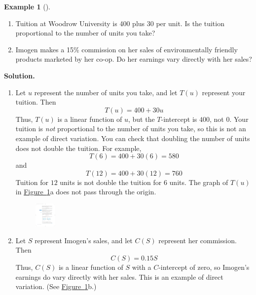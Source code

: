 \documentclass[10pt,]{book}
\theoremstyle{plain}
\theoremstyle{definition}
\theoremstyle{definition}
\theoremstyle{definition}
\newtheorem{example}[theorem]{Example}
\theoremstyle{definition}
\theoremstyle{definition}
\numberwithin{equation}{section}
\begin{document}
\begin{example}[]\label{example-two-linear-functions}
\leavevmode%
\begin{enumerate}[label=*\alph**]
\item\hypertarget{li-396}{}Tuition at Woodrow University is \textdollar{}400 plus \textdollar{}30 per unit. Is the tuition proportional to the number of units you take?\item\hypertarget{li-397}{}Imogen makes a 15\% commission on her sales of environmentally friendly products marketed by her co-op. Do her earnings vary directly with her sales?\end{enumerate}
\par\medskip\noindent%
\textbf{Solution.}\quad \leavevmode%
\begin{enumerate}[label=*\alph**]
\item\hypertarget{li-398}{}Let \(u\) represent the number of units you take, and let \(T(u)\) represent your tuition. Then
	\begin{equation*}T(u) = 400 + 30u\end{equation*}
	Thus, \(T(u)\) is a linear function of \(u\), but the \(T\)-intercept is \(400\), not \(0\). Your tuition is \emph{not} proportional to the number of units you take, so this is not an example of direct variation. You can check that doubling the number of units does not double the tuition. For example,
	\begin{equation*}T (6) = 400 + 30(6) = 580\end{equation*}
	and
	\begin{equation*}T (12) = 400 + 30(12) = 760\end{equation*}
	Tuition for \(12\) units is not double the tuition for \(6\) units. The graph of \(T (u)\) in \hyperref[fig-GC-graphs-of-two-linear-functions]{Figure~\ref{fig-GC-graphs-of-two-linear-functions}}a does not pass through the origin.
	\leavevmode%
\begin{figure}
\centering
\includegraphics[width=0.100\textwidth,]{images/fig-GC-graphs-of-two-linear-functions.pdf}\caption{\label{fig-GC-graphs-of-two-linear-functions}}
\end{figure}
\item\hypertarget{li-399}{}
		Let \(S\) represent Imogen’s sales, and let \(C(S)\) represent her commission. Then 
		\begin{equation*}C(S) = 0.15S\end{equation*}
		Thus, \(C(S)\) is a linear function of \(S\) with a \(C\)-intercept of zero, so Imogen's earnings do vary directly with her sales. This is an example of direct variation. (See \hyperref[fig-GC-graphs-of-two-linear-functions]{Figure~\ref{fig-GC-graphs-of-two-linear-functions}}b.)
	\end{enumerate}
\end{example}
\end{document}
